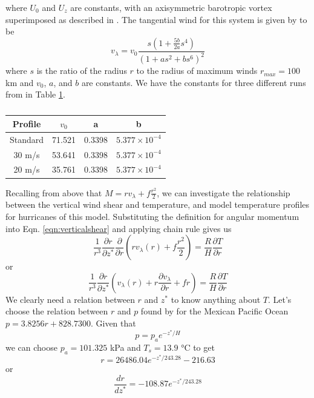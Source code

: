 where $U_0$ and $U_z$ are constants, with an axisymmetric barotropic vortex superimposed as described in \cite{Jones1995}. The tangential wind for this system is given by \cite{Jones1995} to be
\begin{equation}
    v_{\lambda} = v_0\frac{s(1+\frac{5b}{2a}s^4)}{(1+as^2+bs^6)^2}
\end{equation}
where $s$ is the ratio of the radius $r$ to the radius of maximum winds $r_{max}=100$ km and $v_0$, $a$, and $b$ are constants. We have the constants for three different runs from \cite{Jones1995} in Table \ref{tab:constants}.

\begin{table}[]
    \centering
    \begin{tabular}{|c|c|c|c|}
    \hline
         Profile&$v_0$&a&b  \\
         \hline
         Standard&71.521&0.3398&$5.377\times10^{-4}$ \\ 
         \hline
         30 m/s &53.641&0.3398&$5.377\times10^{-4}$ \\ 
         \hline
         20 m/s &35.761&0.3398&$5.377\times10^{-4}$ \\ 
         \hline
    \end{tabular}
    \caption{}
    \label{tab:constants}
\end{table}

Recalling from above that $M=rv_{\lambda}+f\frac{r^2}{2}$, we can investigate the relationship between the vertical wind shear and temperature, and model temperature profiles for hurricanes of this model. Substituting the definition for angular momentum into Eqn. \ref{eqn:verticalshear} and applying chain rule gives us 
\begin{equation}
    \frac{1}{r^3}\frac{\partial r}{\partial z^*}\frac{\partial }{\partial r}(rv_{\lambda}(r)+f\frac{r^2}{2})=\frac{R}{H}\frac{\partial T}{\partial r}
\end{equation}
or
\begin{equation}
    \frac{1}{r^3}\frac{\partial r}{\partial z^*}(v_{\lambda}(r)+r\frac{\partial v_{\lambda}}{\partial r}+fr)=\frac{R}{H}\frac{\partial T}{\partial r}
\end{equation}
We clearly need a relation between $r$ and $z^*$ to know anything about $T$. Let's choose the relation between $r$ and $p$ found by \cite{Silvia2001} for the Mexican Pacific Ocean $p=3.8256r+828.7300$. Given that
\begin{equation*}
    p=p_a e^{-z^*/H}
\end{equation*}
we can choose $p_a=101.325 $ kPa and $T_s=13.9$ °C to get
\begin{equation*}
    r=26486.04e^{-z^*/243.28}-216.63
\end{equation*}
or
\begin{equation*}
    \frac{dr}{dz^*}=-108.87e^{-z^*/243.28}
\end{equation*}

